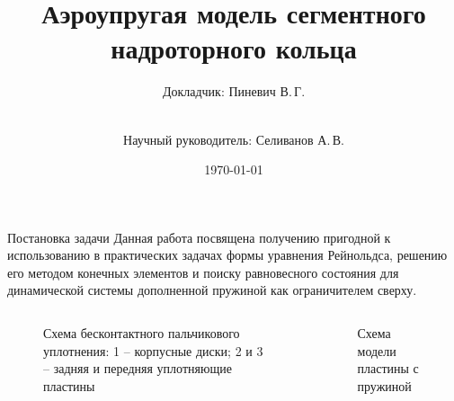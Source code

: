 \documentclass[ignoreonframetext,unicode]{beamer}
\title[Аэроупргугая модель]{Аэроупругая модель сегментного надроторного кольца}
\author[Пиневич В.\,Г.]{Докладчик: Пиневич В.\,Г.\and\\[0.5mm] Научный руководитель: Селиванов А.\,В.}
\institute[каф. Прикладная математика ФН-2]{группа ФН2-81Б}
\date{\today}
\begin{document}
	
	\begin{frame}[plain]
		\maketitle
	\end{frame}

	\begin{frame}{Постановка задачи}
		Данная работа посвящена получению пригодной к использованию в практических задачах формы уравнения Рейнольдса, решению его методом конечных элементов и поиску равновесного состояния для динамической системы дополненной пружиной как ограничителем сверху.
		
			\begin{columns}
	\begin{figure}[!htbp]
	\caption{Схема бесконтактного пальчикового уплотнения: 1 – корпусные
		диски; 2 и 3 – задняя и передняя уплотняющие пластины}
	\label{vved-2}
	\end{figure}
		
	\begin{figure}[!htbp]
		\caption{Схема модели пластины с пружиной}
		\label{pruzina}
	\end{figure}
	\end{columns}	
		
	\end{frame}
\end{document}
